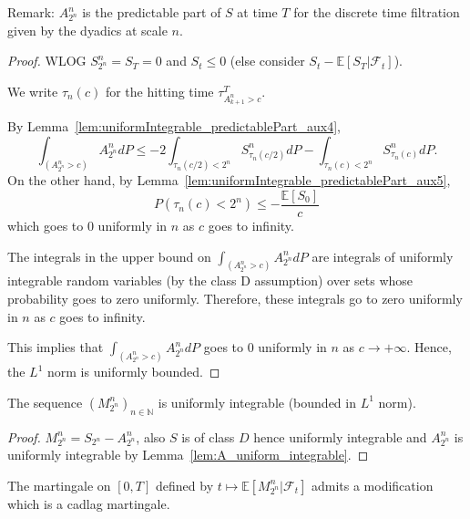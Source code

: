 Remark: $A^n_{2^n}$ is the predictable part of $S$ at time $T$ for the discrete time filtration given by the dyadics at scale $n$.

\begin{proof}
WLOG $S^n_{2^n} = S_T=0$ and $S_t\leq 0$ (else consider $S_t-\mathbb{E}\left[S_T\vert\mathcal{F}_{t}\right]$).

We write $\tau_n(c)$ for the hitting time $\tau^T_{A^n_{k+1}>c}$.

By Lemma~\ref{lem:uniformIntegrable_predictablePart_aux4},
$$
\int_{(A^n_{2^n}>c)} A^n_{2^n} dP
\le -2 \int_{\tau_n(c/2)< 2^n} S^n_{\tau_n(c/2)} dP - \int_{\tau_n(c) < 2^n} S^n_{\tau_n(c)} dP.
$$
On the other hand, by Lemma~\ref{lem:uniformIntegrable_predictablePart_aux5},
$$
P(\tau_n(c)<2^n) \le -\frac{\mathbb{E}[S_0]}{c}
$$
which goes to $0$ uniformly in $n$ as $c$ goes to infinity.

The integrals in the upper bound on $\int_{(A^n_{2^n}>c)} A^n_{2^n} dP$ are integrals of uniformly integrable random variables (by the class D assumption) over sets whose probability goes to zero uniformly.
Therefore, these integrals go to zero uniformly in $n$ as $c$ goes to infinity.

This implies that $\int_{(A^n_{2^n}>c)} A^n_{2^n} dP$ goes to 0 uniformly in $n$ as $c \to +\infty$.
Hence, the $L^1$ norm is uniformly bounded.
\end{proof}


\begin{lemma}\label{lem:M_uniform_integrable}
  The sequence $(M^n_{2^n})_{n\in\mathbb{N}}$ is uniformly integrable (bounded in $L^1$ norm).
\end{lemma}

\begin{proof}
$M^n_{2^n} = S_{2^n} - A^n_{2^n}$, also $S$ is of class $D$ hence uniformly integrable and $A^n_{2^n}$ is uniformly integrable by Lemma~\ref{lem:A_uniform_integrable}.
\end{proof}


\begin{lemma}\label{lem:M_n_cadlag_mg}
The martingale on $[0, T]$ defined by $t \mapsto \mathbb{E}[M^n_{2^n}\vert\mathcal{F}_t]$ admits a modification which is a cadlag martingale.
\end{lemma}

